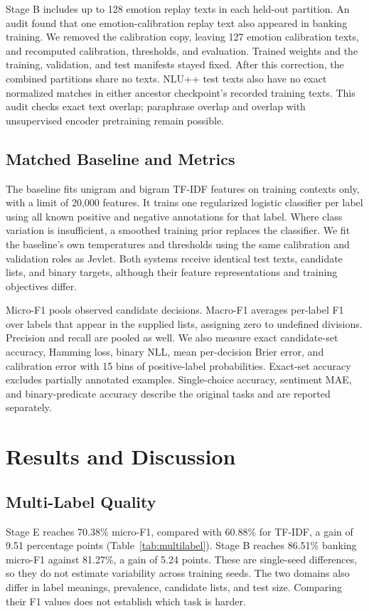 \documentclass[conference]{IEEEtran}
\begin{document}
Stage B includes up to 128 emotion replay texts in each held-out partition. An audit found that one emotion-calibration replay text also appeared in banking training. We removed the calibration copy, leaving 127 emotion calibration texts, and recomputed calibration, thresholds, and evaluation. Trained weights and the training, validation, and test manifests stayed fixed. After this correction, the combined partitions share no texts. NLU++ test texts also have no exact normalized matches in either ancestor checkpoint's recorded training texts. This audit checks exact text overlap; paraphrase overlap and overlap with unsupervised encoder pretraining remain possible.

\subsection{Matched Baseline and Metrics}
The baseline fits unigram and bigram TF-IDF features on training contexts only, with a limit of 20,000 features. It trains one regularized logistic classifier per label using all known positive and negative annotations for that label. Where class variation is insufficient, a smoothed training prior replaces the classifier. We fit the baseline's own temperatures and thresholds using the same calibration and validation roles as Jevlet. Both systems receive identical test texts, candidate lists, and binary targets, although their feature representations and training objectives differ.

Micro-F1 pools observed candidate decisions. Macro-F1 averages per-label F1 over labels that appear in the supplied lists, assigning zero to undefined divisions. Precision and recall are pooled as well. We also measure exact candidate-set accuracy, Hamming loss, binary NLL, mean per-decision Brier error, and calibration error with 15 bins of positive-label probabilities. Exact-set accuracy excludes partially annotated examples. Single-choice accuracy, sentiment MAE, and binary-predicate accuracy describe the original tasks and are reported separately.

\section{Results and Discussion}
\subsection{Multi-Label Quality}
Stage E reaches 70.38\% micro-F1, compared with 60.88\% for TF-IDF, a gain of 9.51 percentage points (Table~\ref{tab:multilabel}). Stage B reaches 86.51\% banking micro-F1 against 81.27\%, a gain of 5.24 points. These are single-seed differences, so they do not estimate variability across training seeds. The two domains also differ in label meanings, prevalence, candidate lists, and test size. Comparing their F1 values does not establish which task is harder.
\end{document}
